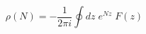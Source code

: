 \begin{equation}\label{zcontour}
\rho(N) = - \frac{1}{2 \pi i} \oint d z \; 
e^{N z} \; F(z) 
\end{equation}

